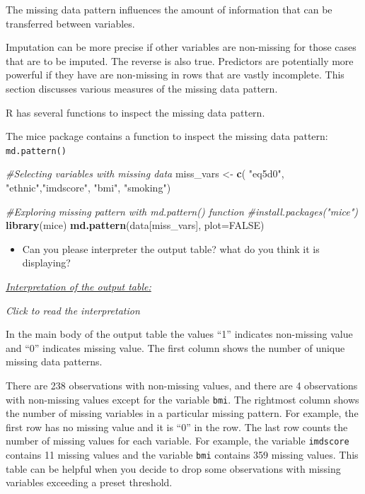 \documentclass[
]{article}
\newenvironment{Shaded}{\begin{snugshade}}{\end{snugshade}}
\newcommand{\AttributeTok}[1]{\textcolor[rgb]{0.13,0.29,0.53}{#1}}
\newcommand{\CommentTok}[1]{\textcolor[rgb]{0.56,0.35,0.01}{\textit{#1}}}
\newcommand{\ConstantTok}[1]{\textcolor[rgb]{0.56,0.35,0.01}{#1}}
\newcommand{\FunctionTok}[1]{\textcolor[rgb]{0.13,0.29,0.53}{\textbf{#1}}}
\newcommand{\NormalTok}[1]{#1}
\newcommand{\OtherTok}[1]{\textcolor[rgb]{0.56,0.35,0.01}{#1}}
\newcommand{\StringTok}[1]{\textcolor[rgb]{0.31,0.60,0.02}{#1}}
\providecommand{\tightlist}{%
  \setlength{\itemsep}{0pt}\setlength{\parskip}{0pt}}
\begin{document}
The missing data pattern influences the amount of information that can
be transferred between variables.

Imputation can be more precise if other variables are non-missing for
those cases that are to be imputed. The reverse is also true. Predictors
are potentially more powerful if they have are non-missing in rows that
are vastly incomplete. This section discusses various measures of the
missing data pattern.

R has several functions to inspect the missing data pattern.

The mice package contains a function to inspect the missing data
pattern: \texttt{md.pattern()}

\begin{Shaded}
\begin{Highlighting}[]
\CommentTok{\#Selecting variables with missing data}
\NormalTok{miss\_vars }\OtherTok{\textless{}{-}} \FunctionTok{c}\NormalTok{( }\StringTok{"eq5d0"}\NormalTok{, }\StringTok{"ethnic"}\NormalTok{,}\StringTok{"imdscore"}\NormalTok{, }\StringTok{"bmi"}\NormalTok{, }\StringTok{"smoking"}\NormalTok{)}

\CommentTok{\#Exploring missing pattern with md.pattern() function}
\CommentTok{\#install.packages("mice")}
\FunctionTok{library}\NormalTok{(mice)}
\FunctionTok{md.pattern}\NormalTok{(data[miss\_vars], }\AttributeTok{plot=}\ConstantTok{FALSE}\NormalTok{)}
\end{Highlighting}
\end{Shaded}

\begin{itemize}
\tightlist
\item
  Can you please interpreter the output table? what do you think it is
  displaying?
\end{itemize}

\ul{\emph{Interpretation of the output table:}}

\emph{Click to read the interpretation}

In the main body of the output table the values ``1'' indicates
non-missing value and ``0'' indicates missing value. The first column
shows the number of unique missing data patterns.

There are 238 observations with non-missing values, and there are 4
observations with non-missing values except for the variable
\texttt{bmi}. The rightmost column shows the number of missing variables
in a particular missing pattern. For example, the first row has no
missing value and it is ``0'' in the row. The last row counts the number
of missing values for each variable. For example, the variable
\texttt{imdscore} contains 11 missing values and the variable
\texttt{bmi} contains 359 missing values. This table can be helpful when
you decide to drop some observations with missing variables exceeding a
preset threshold.
\end{document}
